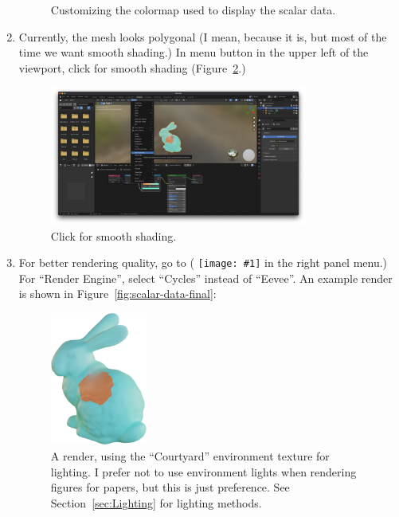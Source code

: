 \documentclass[10pt]{article}
\DeclareRobustCommand{\inlinepic}[1]{%
  \begingroup\normalfont
  \texttt{[image: \#1]}%
  \endgroup
}
\begin{document}
\begin{enumerate}
\begin{figure}[H]
        \caption{Customizing the colormap used to display the scalar data.}
        \label{fig:uv_separateXYZ_colorramp}
    \end{figure}
    \item Currently, the mesh looks polygonal (I mean, because it is, but most of the time we want smooth shading.) In  menu button in the upper left of the viewport, click  for smooth shading (Figure~\ref{fig:shade_smooth_bunny}.)
    \begin{figure}[H]
        \centering
        \captionsetup{width=0.8\textwidth}
        \includegraphics[width=0.8\textwidth]{images/2022-06-17_shade-smooth-bunny.png}
        \caption{Click  for smooth shading.}
        \label{fig:shade_smooth_bunny}
    \end{figure}
    \item For better rendering quality, go to  (\inlinepic{images/2022-06-17_render-properties-icon.png} in the right panel menu.) For ``Render Engine'', select ``Cycles'' instead of ``Eevee''. An example render is shown in Figure~\ref{fig:scalar-data-final}:
    \begin{figure}[H]
        \centering
        \captionsetup{width=0.8\textwidth}
        \includegraphics[width=0.3\textwidth]{images/scalar-data-final.png}
        \caption{A render, using the ``Courtyard'' environment texture for lighting. I prefer not to use environment lights when rendering figures for papers, but this is just preference. See Section~\ref{sec:Lighting} for lighting methods.}

\end{figure}
\end{enumerate}
\end{document}
